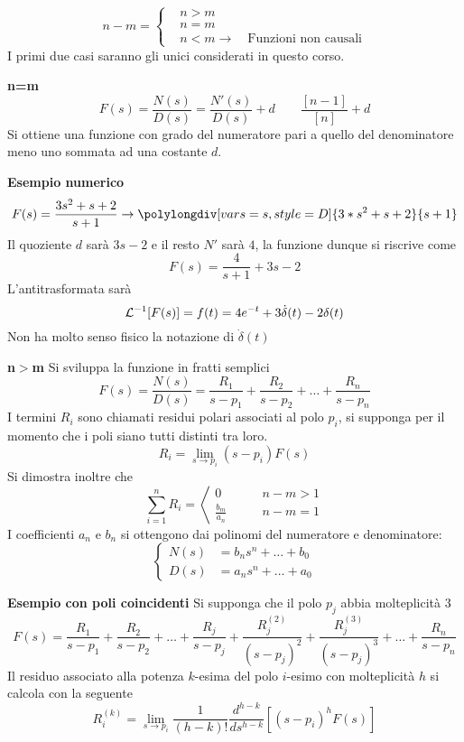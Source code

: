 $$
n-m =
\left\{\begin{aligned}
&n>m\\
&n=m\\
&n<m  \rightarrow \quad \text{Funzioni non causali}
\end{aligned}\right.
$$
I primi due casi saranno gli unici considerati in questo corso.

\textbf{n=m}
$$
F(s) = \frac{N(s)}{D(s)} = \frac{N'(s)}{D(s)} + d\qquad \frac{[n-1]}{[n]} +d
$$
Si ottiene una funzione con grado del numeratore pari a quello del denominatore
meno uno sommata ad una costante $d$.

\textbf{Esempio numerico}
$$
F(s) =\frac{3s^2+s+2}{s+1}  \rightarrow
\polylongdiv[vars=s,style=D]{3*s^2+s+2}{s+1}
$$
Il quoziente $d$ sarà $3s-2$ e il resto $N'$ sarà $4$, la funzione dunque si
riscrive come
$$
F(s) = \frac{4}{s+1} + 3s - 2
$$
L'antitrasformata sarà
$$
\mathcal{L}^{-1}[F(s)] = f(t) = 4e^{-t}+3\dot{\delta}(t)-2\delta(t)
$$
Non ha molto senso fisico la notazione di $\dot{\delta}(t)$

\newpage
\textbf{n$>$m}\newline
Si sviluppa la funzione in fratti semplici
$$
F(s) = \frac{N(s)}{D(s)} = \frac{R_1}{s-p_1} + \frac{R_2}{s-p_2} + \dots +
\frac{R_n}{s-p_n}
$$
I termini $R_i$ sono chiamati residui polari associati al polo $p_i$, si
supponga per il momento che i poli siano tutti distinti tra loro.
$$
R_i = \lim_{s\to p_i} (s-p_i)F(s)
$$
Si dimostra inoltre che
$$
\sum_{i=1}^n R_i = \left\langle
\begin{aligned}
0 &\qquad n-m>1\\
\frac{b_m}{a_n} &\qquad n-m=1
\end{aligned}\right.
$$
I coefficienti $a_n$ e $b_n$ si ottengono dai polinomi del numeratore e
denominatore:
$$
\left\{\begin{aligned}
N(s) &= b_ns^n + \ldots+b_0\\
D(s) &= a_n s^n + \ldots + a_0
\end{aligned}\right.
$$

\textbf{Esempio con poli coincidenti}\newline
Si supponga che il polo $p_j$ abbia molteplicità $3$
$$
F(s) =
\frac{R_1}{s-p_1}+\frac{R_2}{s-p_2}+\ldots+\frac{R_j}{s-p_j}+
\frac{R_j^{(2)}}{(s-p_j)^2 }+
\frac{R_j^{(3)}}{(s-p_j)^3}+\ldots+
\frac{R_n}{s-p_n}
$$
Il residuo associato alla potenza $k$-esima del polo $i$-esimo con molteplicità
$h$ si calcola con la seguente
$$
R_i^{(k)} = \lim_{s\to p_i} \frac{1}{(h-k)!}\frac{d^{h-k}}{ds^{h-k}}
\left[(s-p_i)^hF(s)\right]
$$
